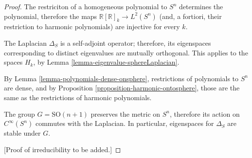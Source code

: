\begin{proof}
 The restriciton of a homogeneous polynomial to $S^n$ determines the polynomial, therefore the maps $\mathbb R[\mathbb R]_k \to L^2(S^n)$ (and, a fortiori, their restriction to harmonic polynomials) are injective for every $k$.
 
 The Laplacian $\Delta_S$ is a self-adjoint operator; therefore, its eigenspaces corresponding to distinct eigenvalues are mutually orthogonal. This applies to the spaces $H_k$, by Lemma \ref{lemma-eigenvalue-sphereLaplacian}.
 
 By Lemma  \ref{lemma-polynomials-dense-onsphere}, restrictions of polynomials to $S^n$ are dense, and by Proposition \ref{proposition-harmonic-ontosphere}, those are the same as the restrictions of harmonic polynomials.
 
 The group $G=\text{SO}(n+1)$ preserves the metric on $S^n$, therefore its action on $C^\infty(S^n)$ commutes with the Laplacian. In particular, eigenspaces for $\Delta_S$ are stable under $G$. 
 
 [Proof of irreducibility to be added.]
\end{proof}












